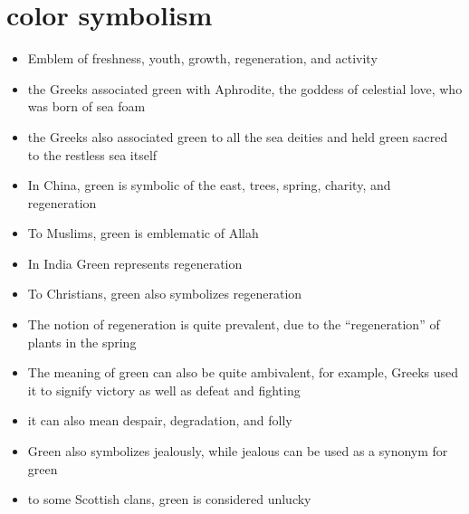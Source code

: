 \documentclass[12pt]{article}
\begin{document}
    \section{color symbolism}
        \begin{itemize}
            \item Emblem of freshness, youth, growth, regeneration, and activity \autocite[140]{colorSymbolism}
            \item the Greeks associated green with Aphrodite, the goddess of celestial love, who was born of sea foam
            \item the Greeks also associated green to all the sea deities and held green sacred to the restless sea itself \autocite[140]{colorSymbolism}
            \item In China, green is symbolic of the east, trees, spring, charity, and regeneration \autocite[140]{colorSymbolism}
            \item To Muslims, green is emblematic of Allah \autocite[140]{colorSymbolism}
            \item In India Green represents regeneration \autocite[140]{colorSymbolism}
            \item To Christians, green also symbolizes regeneration \autocite[140]{colorSymbolism}
            \item The notion of regeneration is quite prevalent, due to the ``regeneration'' of plants in the spring \autocite[141]{colorSymbolism}
            \item The meaning of green can also be quite ambivalent, for example, Greeks used it to signify victory as well as defeat and fighting \autocite[141]{colorSymbolism}
            \item it can also mean despair, degradation, and folly \autocite[141]{colorSymbolism}
            \item Green also symbolizes jealously, while jealous can be used as a synonym for green \autocite[141]{colorSymbolism}
            \item to some Scottish clans, green is considered unlucky \autocite[141]{colorSymbolism}
        \end{itemize}



    \newpage
    \printbibliography
\end{document}
